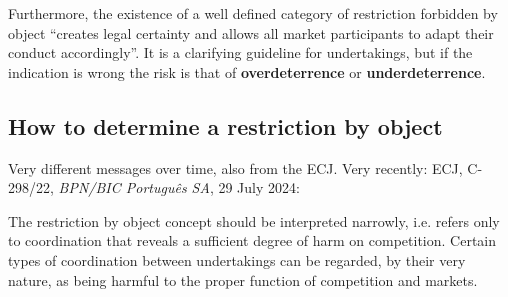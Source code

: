         Furthermore, the existence of a well defined category of restriction forbidden by object “creates legal certainty and allows all market participants to adapt their conduct accordingly”. It is a clarifying guideline for undertakings, but if the indication is wrong the risk is that of \textbf{overdeterrence} or \textbf{underdeterrence}.

    \subsection{How to determine a restriction by object}

        Very different messages over time, also from the ECJ. Very recently: ECJ, C-298/22, \textit{BPN/BIC Português SA}, 29 July 2024:

        The restriction by object concept should be interpreted narrowly, i.e. refers only to coordination that reveals a sufficient degree of harm on competition. Certain types of coordination between undertakings can be regarded, by their very nature, as being harmful to the proper function of competition and markets.
        

